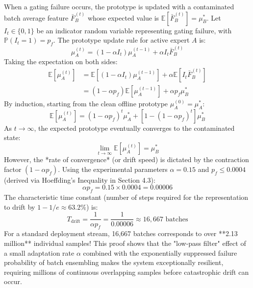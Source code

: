 \documentclass{article}
\theoremstyle{plain}
\theoremstyle{definition}
\theoremstyle{remark}
\begin{document}
When a gating failure occurs, the prototype is updated with a contaminated batch average feature $\bar{F}_B^{(t)}$ whose expected value is $\mathbb{E}[\bar{F}_B^{(t)}] = \mu_B^*$. Let $I_t \in \{0, 1\}$ be an indicator random variable representing gating failure, with $\mathbb{P}(I_t = 1) = p_f$.
The prototype update rule for active expert $A$ is:
\begin{equation}
    \mu_A^{(t)} = (1 - \alpha I_t) \mu_A^{(t-1)} + \alpha I_t \bar{F}_B^{(t)}
\end{equation}
Taking the expectation on both sides:
\begin{align}
    \mathbb{E}[\mu_A^{(t)}] &= \mathbb{E}[(1 - \alpha I_t) \mu_A^{(t-1)}] + \alpha \mathbb{E}[I_t \bar{F}_B^{(t)}] \nonumber \\
    &= (1 - \alpha p_f) \mathbb{E}[\mu_A^{(t-1)}] + \alpha p_f \mu_B^*
\end{align}
By induction, starting from the clean offline prototype $\mu_A^{(0)} = \mu_A^*$:
\begin{equation}
    \mathbb{E}[\mu_A^{(t)}] = (1 - \alpha p_f)^t \mu_A^* + \left[1 - (1 - \alpha p_f)^t\right] \mu_B^*
\end{equation}
As $t \to \infty$, the expected prototype eventually converges to the contaminated state:
\begin{equation}
    \lim_{t \to \infty} \mathbb{E}[\mu_A^{(t)}] = \mu_B^*
\end{equation}
However, the *rate of convergence* (or drift speed) is dictated by the contraction factor $(1 - \alpha p_f)$.
Using the experimental parameters $\alpha = 0.15$ and $p_f \le 0.0004$ (derived via Hoeffding's Inequality in Section 4.3):
\begin{equation}
    \alpha p_f = 0.15 \times 0.0004 = 0.00006
\end{equation}
The characteristic time constant (number of steps required for the representation to drift by $1-1/e \approx 63.2\%$) is:
\begin{equation}
    T_{\text{drift}} = \frac{1}{\alpha p_f} = \frac{1}{0.00006} \approx 16,667 \text{ batches}
\end{equation}
For a standard deployment stream, 16,667 batches corresponds to over **2.13 million** individual samples! This proof shows that the "low-pass filter" effect of a small adaptation rate $\alpha$ combined with the exponentially suppressed failure probability of batch ensembling makes the system exceptionally resilient, requiring millions of continuous overlapping samples before catastrophic drift can occur.
\end{document}
